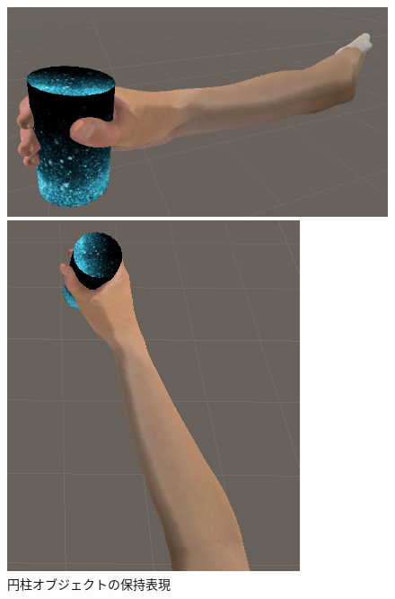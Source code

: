 \documentclass{ltjsreport}
\begin{document}
		\begin{figure}[H]
		\centering
		\begin{minipage}{0.4\columnwidth}
		\centering
		\includegraphics[width = \columnwidth]{../figs/grapcylinder_side.png}
		\end{minipage}
		\hspace{0.04\columnwidth}
		\begin{minipage}{0.2\columnwidth}
		\centering
		\includegraphics[width = \columnwidth]{../figs/grapcylinder_up.png}
		\end{minipage}
		\caption{円柱オブジェクトの保持表現}
		\label{fig:cylinderhold}
		\end{figure}
\end{document}
